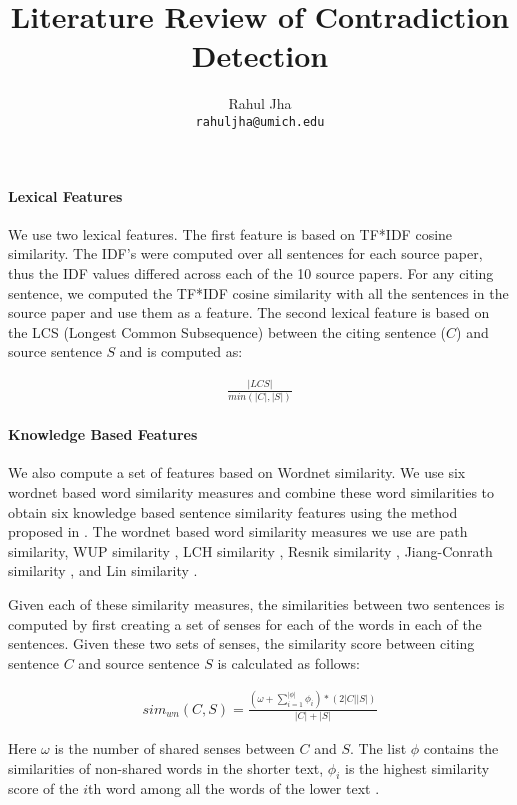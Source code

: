 \documentclass[11pt]{article}
\title{Literature Review of Contradiction Detection}
\author{Rahul Jha \\
  {\tt rahuljha@umich.edu} 
}
\date{}
\begin{document}
\paragraph{Lexical Features} We use two lexical features. The first feature is based on TF*IDF cosine similarity. The IDF's were computed over all sentences for each source paper, thus the IDF values differed across each of the 10 source papers. For any citing sentence, we computed the TF*IDF cosine similarity with all the sentences in the source paper and use them as a feature. The second lexical feature is based on the LCS (Longest Common Subsequence) between the citing sentence ($C$) and source sentence $S$ and is computed as:

\begin{eqnarray*}
  \frac{|LCS|}{min(|C|,|S|)}
\end{eqnarray*}
\paragraph{Knowledge Based Features} We also compute a set of features based on Wordnet similarity. We use six wordnet based word similarity measures and combine these word similarities to obtain six knowledge based sentence similarity features using the method proposed in \cite{Banea2012}. The wordnet based word similarity measures we use are path similarity, WUP similarity \cite{Wu:1994:VSL:981732.981751} , LCH similarity \cite{leacock1998combining}, Resnik similarity \cite{Resnik:1995:UIC:1625855.1625914},  Jiang-Conrath similarity \cite{Jiang97taxonomySimilarity}, and Lin similarity \cite{Lin:1998:IDS:645527.657297}. 

Given each of these similarity measures, the similarities between two sentences is computed by first creating a set of senses for each of the words in each of the sentences. Given these two sets of senses, the similarity score between citing sentence $C$ and source sentence $S$ is calculated as follows:

\begin{eqnarray*}
  sim_{wn}(C,S) = \frac{(\omega + \sum_{i=1}^{|\phi|}\phi_i) * (2|C||S|)}{|C|+|S|}
\end{eqnarray*}

Here $\omega$ is the number of shared senses between $C$ and $S$. The list $\phi$ contains the similarities of non-shared words in the shorter text, $\phi_i$ is the highest similarity score of the $i$th word among all the words of the lower text \cite{S13-1017}. 
\end{document}
